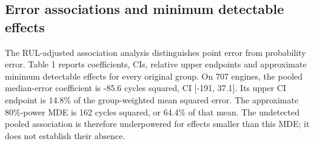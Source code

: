 \documentclass[IJPHM, 2026, 0]{phmsociety}
\begin{document}
\subsection{Error associations and minimum detectable effects}\label{error-associations-and-minimum-detectable-effects}

The RUL-adjusted association analysis distinguishes point error from probability error. Table \mbox{1} reports coefficients, CIs, relative upper endpoints and approximate minimum detectable effects for every original group. On \mbox{707} engines, the pooled median-error coefficient is \mbox{-85.6} cycles squared, CI {[}\mbox{-191}, \mbox{37.1}{]}. Its upper CI endpoint is \mbox{14.8}\% of the group-weighted mean squared error. The approximate \mbox{80}\%-power MDE is \mbox{162} cycles squared, or \mbox{64.4}\% of that mean. The undetected pooled association is therefore underpowered for effects smaller than this MDE; it does not establish their absence.
\end{document}

